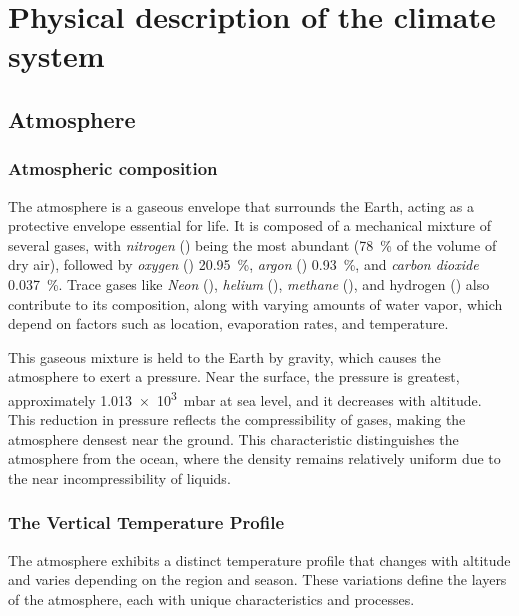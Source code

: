 \chapter{Physical description of the climate system}\label{ch:climate-system-description}

\section{Atmosphere}\label{sec:atm-description}

\subsection{Atmospheric composition}\label{subsec:atm-composition]}

The atmosphere is a gaseous envelope that surrounds the Earth, acting as a protective envelope essential for life.
It is composed of a mechanical mixture of several gases, with \emph{nitrogen} () being the most abundant (\qty{78}{\percent} of the volume of dry air),
followed by \emph{oxygen} () \qty{20.95}{\percent}, \emph{argon} () \qty{0.93}{\percent},
and \emph{carbon dioxide}  \qty{0.037}{\percent}.
Trace gases like \emph{Neon} (), \emph{helium} (), \emph{methane} (), and hydrogen () also contribute to its composition, along
with varying amounts of water vapor, which depend on factors such as location, evaporation rates, and temperature.

This gaseous mixture is held to the Earth by gravity, which causes the atmosphere to exert a pressure. Near the surface, the pressure is greatest, approximately \qty{1.013e3}{\milli\bar} at sea level, and it decreases with altitude. This reduction in pressure reflects the compressibility of gases, making the atmosphere densest near the ground. This characteristic distinguishes the atmosphere from the ocean, where the density remains relatively uniform due to the near incompressibility of liquids.

\subsection{The Vertical Temperature Profile}

The atmosphere exhibits a distinct temperature profile that changes with altitude and varies depending on the region and season. These variations define the layers of the atmosphere, each with unique characteristics and processes.

